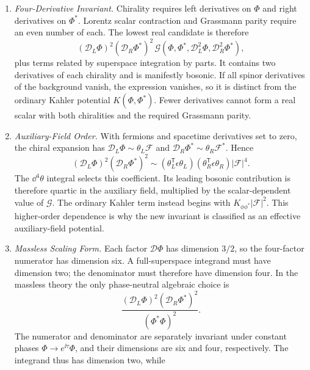 \begin{enumerate}
  \begin{enumerate}
    \item \emph{Four-Derivative Invariant.}
    Chirality requires left derivatives on \(\Phi\) and right derivatives
      on \(\Phi^*\).  Lorentz scalar contraction and Grassmann parity require
      an even number of each.  The lowest real candidate is therefore
      \[
        (\mathcal D_L\Phi)^2(\mathcal D_R\Phi^*)^2
        \,\mathcal G\!
        \left(\Phi,\Phi^*,\mathcal D_L^2\Phi,
          \mathcal D_R^2\Phi^*\right),
      \]
      plus terms related by superspace integration by parts.  It contains
      two derivatives of each chirality and is manifestly bosonic.  If all
      spinor derivatives of the background vanish, the expression vanishes,
      so it is distinct from the ordinary Kahler potential
      \(K(\Phi,\Phi^*)\).  Fewer derivatives cannot form a real scalar with
      both chiralities and the required Grassmann parity.
    \item \emph{Auxiliary-Field Order.}
    With fermions and spacetime derivatives set to zero, the chiral
      expansion has
      \(\mathcal D_L\Phi\sim\theta_L\mathcal F\) and
      \(\mathcal D_R\Phi^*\sim\theta_R\mathcal F^*\).  Hence
      \[
        (\mathcal D_L\Phi)^2(\mathcal D_R\Phi^*)^2
          \sim
          (\theta_L^{\mathsf T}\epsilon\theta_L)
          (\theta_R^{\mathsf T}\epsilon\theta_R)
          |\mathcal F|^4 .
      \]
      The \(\dd^4\theta\) integral selects this coefficient.  Its leading
      bosonic contribution is therefore quartic in the auxiliary field,
      multiplied by the scalar-dependent value of \(\mathcal G\).  The
      ordinary Kahler term instead begins with
      \(K_{\phi\phi^*}|\mathcal F|^2\).  This higher-order dependence is why
      the new invariant is classified as an effective auxiliary-field
      potential.
    \item \emph{Massless Scaling Form.}
    Each factor \(\mathcal D\Phi\) has dimension \(3/2\), so the four-factor
      numerator has dimension six.  A full-superspace integrand must have
      dimension two; the denominator must therefore have dimension four.
      In the massless theory the only phase-neutral algebraic choice is
      \[
        \frac{
          (\mathcal D_L\Phi)^2(\mathcal D_R\Phi^*)^2
        }{(\Phi^*\Phi)^2}.
      \]
      The numerator and denominator are separately invariant under constant
      phases \(\Phi\to e^{\ii\tau}\Phi\), and their dimensions are six and
      four, respectively.  The integrand thus has dimension two, while

\end{enumerate}
\end{enumerate}
